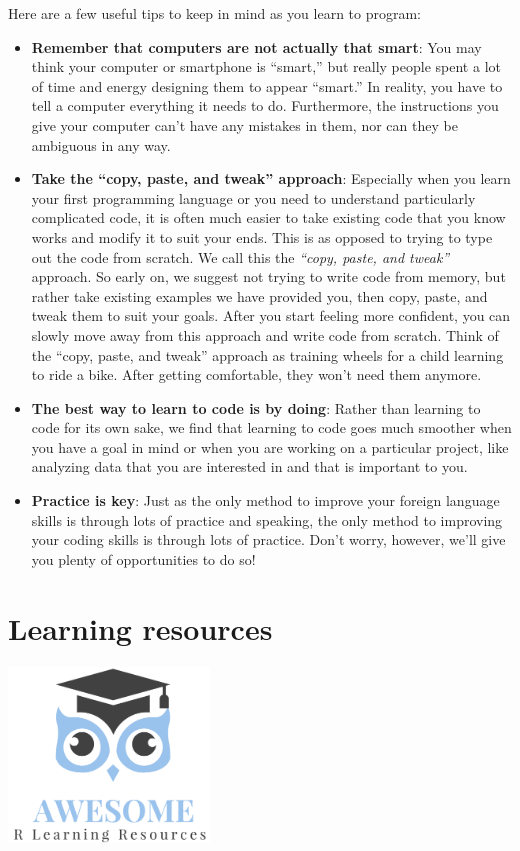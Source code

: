 \documentclass[
  12pt,
  oneside]{book}
\providecommand{\tightlist}{%
  \setlength{\itemsep}{0pt}\setlength{\parskip}{0pt}}
\theoremstyle{definition}
\theoremstyle{definition}
\theoremstyle{definition}
\theoremstyle{definition}
\theoremstyle{remark}
\begin{document}
Here are a few useful tips to keep in mind as you learn to program:

\begin{itemize}
\tightlist
\item
  \textbf{Remember that computers are not actually that smart}: You may think your computer or smartphone is ``smart,'' but really people spent a lot of time and energy designing them to appear ``smart.'' In reality, you have to tell a computer everything it needs to do. Furthermore, the instructions you give your computer can't have any mistakes in them, nor can they be ambiguous in any way.
\item
  \textbf{Take the ``copy, paste, and tweak'' approach}: Especially when you learn your first programming language or you need to understand particularly complicated code, it is often much easier to take existing code that you know works and modify it to suit your ends. This is as opposed to trying to type out the code from scratch. We call this the \emph{``copy, paste, and tweak''} approach. So early on, we suggest not trying to write code from memory, but rather take existing examples we have provided you, then copy, paste, and tweak them to suit your goals. After you start feeling more confident, you can slowly move away from this approach and write code from scratch. Think of the ``copy, paste, and tweak'' approach as training wheels for a child learning to ride a bike. After getting comfortable, they won't need them anymore.
\item
  \textbf{The best way to learn to code is by doing}: Rather than learning to code for its own sake, we find that learning to code goes much smoother when you have a goal in mind or when you are working on a particular project, like analyzing data that you are interested in and that is important to you.
\item
  \textbf{Practice is key}: Just as the only method to improve your foreign language skills is through lots of practice and speaking, the only method to improving your coding skills is through lots of practice. Don't worry, however, we'll give you plenty of opportunities to do so!
\end{itemize}

\hypertarget{Rlearninglit}{%
\section{Learning resources}\label{Rlearninglit}}

\includegraphics[width=0.4\textwidth,height=\textheight]{fig/aweres.png}
\end{document}
